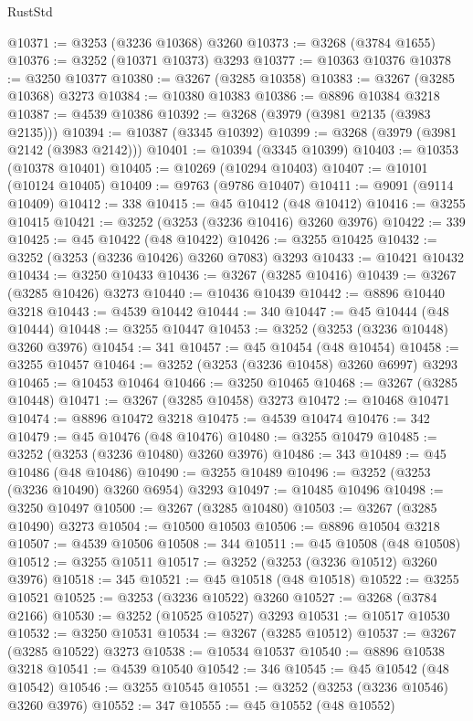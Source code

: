 \begin{lexlean}{RustStd}
\begin{coremodule}
@10371 := @3253 (@3236 @10368) @3260
@10373 := @3268 (@3784 @1655)
@10376 := @3252 (@10371 @10373) @3293
@10377 := @10363 @10376
@10378 := @3250 @10377
@10380 := @3267 (@3285 @10358)
@10383 := @3267 (@3285 @10368) @3273
@10384 := @10380 @10383
@10386 := @8896 @10384 @3218
@10387 := @4539 @10386
@10392 := @3268 (@3979 (@3981 @2135 (@3983 @2135)))
@10394 := @10387 (@3345 @10392)
@10399 := @3268 (@3979 (@3981 @2142 (@3983 @2142)))
@10401 := @10394 (@3345 @10399)
@10403 := @10353 (@10378 @10401)
@10405 := @10269 (@10294 @10403)
@10407 := @10101 (@10124 @10405)
@10409 := @9763 (@9786 @10407)
@10411 := @9091 (@9114 @10409)
@10412 := 338
@10415 := @45 @10412 (@48 @10412)
@10416 := @3255 @10415
@10421 := @3252 (@3253 (@3236 @10416) @3260 @3976)
@10422 := 339
@10425 := @45 @10422 (@48 @10422)
@10426 := @3255 @10425
@10432 := @3252 (@3253 (@3236 @10426) @3260 @7083) @3293
@10433 := @10421 @10432
@10434 := @3250 @10433
@10436 := @3267 (@3285 @10416)
@10439 := @3267 (@3285 @10426) @3273
@10440 := @10436 @10439
@10442 := @8896 @10440 @3218
@10443 := @4539 @10442
@10444 := 340
@10447 := @45 @10444 (@48 @10444)
@10448 := @3255 @10447
@10453 := @3252 (@3253 (@3236 @10448) @3260 @3976)
@10454 := 341
@10457 := @45 @10454 (@48 @10454)
@10458 := @3255 @10457
@10464 := @3252 (@3253 (@3236 @10458) @3260 @6997) @3293
@10465 := @10453 @10464
@10466 := @3250 @10465
@10468 := @3267 (@3285 @10448)
@10471 := @3267 (@3285 @10458) @3273
@10472 := @10468 @10471
@10474 := @8896 @10472 @3218
@10475 := @4539 @10474
@10476 := 342
@10479 := @45 @10476 (@48 @10476)
@10480 := @3255 @10479
@10485 := @3252 (@3253 (@3236 @10480) @3260 @3976)
@10486 := 343
@10489 := @45 @10486 (@48 @10486)
@10490 := @3255 @10489
@10496 := @3252 (@3253 (@3236 @10490) @3260 @6954) @3293
@10497 := @10485 @10496
@10498 := @3250 @10497
@10500 := @3267 (@3285 @10480)
@10503 := @3267 (@3285 @10490) @3273
@10504 := @10500 @10503
@10506 := @8896 @10504 @3218
@10507 := @4539 @10506
@10508 := 344
@10511 := @45 @10508 (@48 @10508)
@10512 := @3255 @10511
@10517 := @3252 (@3253 (@3236 @10512) @3260 @3976)
@10518 := 345
@10521 := @45 @10518 (@48 @10518)
@10522 := @3255 @10521
@10525 := @3253 (@3236 @10522) @3260
@10527 := @3268 (@3784 @2166)
@10530 := @3252 (@10525 @10527) @3293
@10531 := @10517 @10530
@10532 := @3250 @10531
@10534 := @3267 (@3285 @10512)
@10537 := @3267 (@3285 @10522) @3273
@10538 := @10534 @10537
@10540 := @8896 @10538 @3218
@10541 := @4539 @10540
@10542 := 346
@10545 := @45 @10542 (@48 @10542)
@10546 := @3255 @10545
@10551 := @3252 (@3253 (@3236 @10546) @3260 @3976)
@10552 := 347
@10555 := @45 @10552 (@48 @10552)

\end{coremodule}
\end{lexlean}
